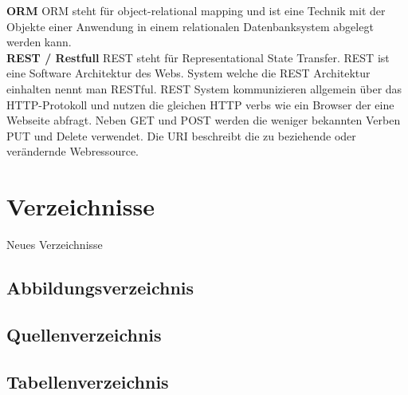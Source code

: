 \textbf{ORM} ORM steht für object-relational mapping und ist eine
Technik mit der Objekte einer Anwendung in einem relationalen
Datenbanksystem abgelegt werden kann.\\

\textbf{REST / Restfull} REST steht für Representational State Transfer.
REST ist eine Software Architektur des Webs. System welche die REST
Architektur einhalten nennt man RESTful. REST System kommunizieren
allgemein über das HTTP-Protokoll und nutzen die gleichen HTTP verbs wie
ein Browser der eine Webseite abfragt. Neben GET und POST werden die
weniger bekannten Verben PUT und Delete verwendet. Die URI beschreibt
die zu beziehende oder verändernde Webressource.

\chapter{Verzeichnisse}\label{verzeichnisse}

Neues Verzeichnisse

\section{Abbildungsverzeichnis}\label{abbildungsverzeichnis}

\renewcommand{\listfigurename}{} 

\begingroup\let\clearpage\relax
\listoffigures
\endgroup

\pagebreak

\section{Quellenverzeichnis}\label{quellenverzeichnis}

\renewcommand{\bibname}{}

\begingroup \let\clearpage\relax
\printbibliography
\endgroup

\pagebreak

\section{Tabellenverzeichnis}\label{tabellenverzeichnis}

\renewcommand{\listtablename}{} 

\begingroup \let\clearpage\relax
\listoftables
\endgroup





